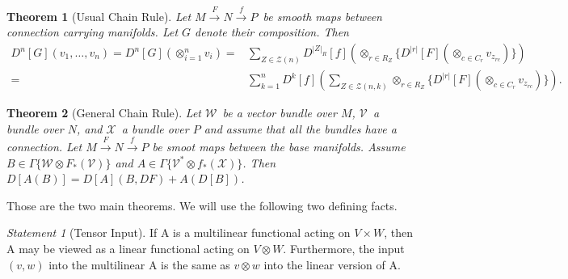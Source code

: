 \documentclass[11pt]{article}
\newtheorem{theorem}{Theorem}
\theoremstyle{remark}
\newtheorem{statementr}{Statement}
\begin{document}
\begin{theorem}[Usual Chain Rule]
Let \ensuremath{{M} \overset{F}{\to} {N}
\overset{f}{\to} {P}}\ be smooth maps between connection carrying
manifolds. Let $G$ denote their composition. Then 
\begin{align*}
\ensuremath{D^{n} [{G}] ({v_1, \ldots, v_n}) } = \ensuremath{D^{n} [{G}] ({\mathop{\otimes}_{i=1}^n v_i}) } 
= &\sum_{\ensuremath{Z} \in \ensuremath{\mathcal{\ensuremath{Z}}}(n)} 
\ensuremath{D^{ |\ensuremath{Z}|_R } [{f}] ({\mathop{\otimes}_{r \in R_{\ensuremath{Z}}} \{\ensuremath{D^{|r|} [{F}] ({
\mathop{\otimes}_{c \in C_{r}} v_{\ensuremath{z}_{rc}}}) }\}}) } \\
= & \sum_{k =1}^n \ensuremath{D^{k} [{f}] ({\sum_{\ensuremath{Z} \in \ensuremath{\mathcal{\ensuremath{Z}}}(n,k)}
{\mathop{\otimes}_{r \in R_{\ensuremath{Z}}} \{\ensuremath{D^{|r|} [{F}] ({ 
\mathop{\otimes}_{c \in C_{r}} v_{\ensuremath{z}_{rc}}  }) }\}}}) }.
\end{align*}
\end{theorem}

\begin{theorem}[General Chain Rule]
Let \ensuremath{\mathcal{W}}\ be a vector bundle over $M$, \ensuremath{\mathcal{V}}\ a bundle over $N$,
and \ensuremath{\mathcal{X}}\ a bundle over $P$ and assume that all the bundles have a
connection. Let 
\ensuremath{{M} \overset{F}{\to} {N}
\overset{f}{\to} {P}} be smoot maps between the base manifolds.
Assume $B \in \ensuremath{\Gamma \{ \ensuremath{\mathcal{W}} \otimes \ensuremath{{F}_{*}({\ensuremath{\mathcal{V}}})} \}}$ and $A \in
\ensuremath{\Gamma \{ \ensuremath{{\ensuremath{\mathcal{V}}}^{*}} \otimes \ensuremath{{f}_{*}({\ensuremath{\mathcal{X}}})} \}}$. Then $D[A(B)] = D[A](B,
DF) + A(D[B])$. 
\end{theorem}

Those are the two main theorems. We will use the following two defining
facts. 


\begin{statementr}[Tensor Input]
If A is a multilinear functional acting on $V \times W$, then A may be
viewed as a
linear functional acting on $V \otimes W$. Furthermore, the input
$(v,w)$ into the multilinear A is the same as $v\otimes w$ into the
linear version of A.
\end{statementr}
\end{document}
